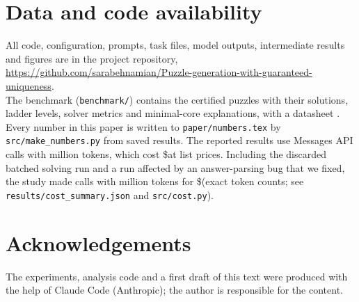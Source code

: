 \documentclass[10pt,twocolumn]{article}
\begin{document}
\section*{Data and code availability}
All code, configuration, prompts, task files, model outputs, intermediate results and figures are in the project repository,\\ \url{https://github.com/sarabehnamian/Puzzle-generation-with-guaranteed-uniqueness}.\\ The benchmark (\texttt{benchmark/}) contains the certified puzzles with their solutions, ladder levels, solver metrics and minimal-core explanations, with a datasheet \citep{gebru2021datasheets}. Every number in this paper is written to \texttt{paper/numbers.tex} by \texttt{src/make\_numbers.py} from saved results. The reported results use \NCallsFinal Messages API calls with \TokensFinalM million tokens, which cost \$\CostFinal at list prices. Including the discarded batched solving run and a run affected by an answer-parsing bug that we fixed, the study made \NCalls calls with \TokensM million tokens for \$\CostUSD (exact token counts; see \texttt{results/cost\_summary.json} and \texttt{src/cost.py}).

\section*{Acknowledgements}
The experiments, analysis code and a first draft of this text were produced with the help of Claude Code (Anthropic); the author is responsible for the content.



\end{document}
